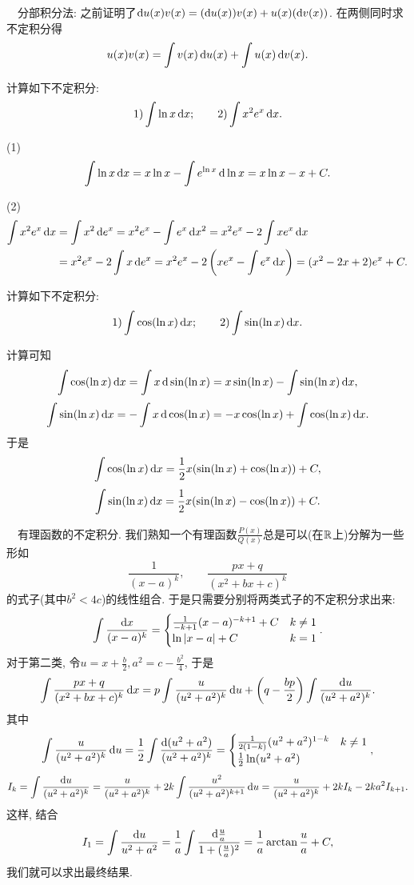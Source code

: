 ~~分部积分法: 之前证明了$\mathop{}\!\mathrm{d} u(x)v(x) = (\mathop{}\!\mathrm{d} u(x)) v(x) + u(x) (\mathop{}\!\mathrm{d} v(x))$. 在两侧同时求不定积分得$$u(x)v(x) = \int v(x) \mathop{}\!\mathrm{d} u(x) + \int u(x) \mathop{}\!\mathrm{d} v(x). $$

\begin{example}
	计算如下不定积分: $$1) \int \ln x \mathop{}\!\mathrm{d} x;\qquad 2) \int x^2e^x \mathop{}\!\mathrm{d} x. $$
\end{example}
\begin{solution}
	(1) $$\int \ln x \mathop{}\!\mathrm{d} x = x\ln x - \int e^{\ln x}\mathop{}\!\mathrm{d} \ln x = x\ln x - x + C.$$
	
	(2) \begin{align*}
		\int x^2e^x \mathop{}\!\mathrm{d} x &= \int x^2 \mathop{}\!\mathrm{d} e^x = x^2e^x - \int e^x \mathop{}\!\mathrm{d} x^2 = x^2e^x - 2\int xe^x \mathop{}\!\mathrm{d} x \\
		&= x^2e^x - 2\int x \mathop{}\!\mathrm{d} e^x = x^2e^x - 2\left( xe^x-\int e^x \mathop{}\!\mathrm{d} x \right) = (x^2-2x+2)e^x + C. 
	\end{align*}
\end{solution}

\begin{example}
	计算如下不定积分: $$1) \int \cos (\ln x) \mathop{}\!\mathrm{d} x;\qquad 2) \int \sin (\ln x) \mathop{}\!\mathrm{d} x.$$
\end{example}
\begin{solution}
	计算可知$$\int \cos (\ln x) \mathop{}\!\mathrm{d} x = \int x \mathop{}\!\mathrm{d} \sin (\ln x) = x\sin (\ln x) - \int \sin (\ln x) \mathop{}\!\mathrm{d} x,$$
	$$\int \sin (\ln x) \mathop{}\!\mathrm{d} x = -\int x \mathop{}\!\mathrm{d} \cos (\ln x) = -x\cos (\ln x) + \int \cos (\ln x) \mathop{}\!\mathrm{d} x.$$
	于是$$\int \cos (\ln x) \mathop{}\!\mathrm{d} x = \frac{1}{2}x(\sin (\ln x)+ \cos (\ln x)) +C,$$
	$$\int \sin (\ln x) \mathop{}\!\mathrm{d} x = \frac{1}{2}x(\sin (\ln x)- \cos (\ln x)) +C.$$
\end{solution}

~~有理函数的不定积分. 我们熟知一个有理函数$\frac{P(x)}{Q(x)}$总是可以(在$\mathbb{R}$上)分解为一些形如$$\frac{1}{(x-a)^k},\qquad \frac{px+q}{(x^2+bx+c)^k}$$
的式子(其中$b^2<4c$)的线性组合. 于是只需要分别将两类式子的不定积分求出来: 
$$\int \frac{\mathop{}\!\mathrm{d} x}{(x-a)^k} = \begin{cases}
	\frac{1}{-k+1}(x-a)^{-k+1}+C & k\neq 1 \\ \ln |x-a| + C & k=1
\end{cases}.$$
对于第二类, 令$u=x+\frac{b}{2}, a^2=c-\frac{b^2}{4}$, 于是$$\int \frac{px+q}{(x^2+bx+c)^k} \mathop{}\!\mathrm{d} x = p \int \frac{u}{(u^2+a^2)^k} \mathop{}\!\mathrm{d} u + \left(q-\frac{bp}{2} \right) \int \frac{\mathop{}\!\mathrm{d} u}{(u^2+a^2)^k}.$$
其中$$\int \frac{u}{(u^2+a^2)^k} \mathop{}\!\mathrm{d} u = \frac{1}{2} \int \frac{\mathop{}\!\mathrm{d} (u^2+a^2)}{(u^2+a^2)^k} = \begin{cases}
	\frac{1}{2(1-k)}(u^2+a^2)^{1-k} & k\neq 1 \\ \frac{1}{2}\ln (u^2+a^2)
\end{cases}, $$
$$I_k = \int \frac{\mathop{}\!\mathrm{d} u}{(u^2+a^2)^k} = \frac{u}{(u^2+a^2)^k} + 2k \int \frac{u^2}{(u^2+a^2)^{k+1}} \mathop{}\!\mathrm{d} u = \frac{u}{(u^2+a^2)^k} + 2kI_k - 2ka^2I_{k+1}.$$
这样, 结合$$I_1 = \int \frac{\mathop{}\!\mathrm{d} u}{u^2+a^2} = \frac{1}{a} \int \frac{\mathop{}\!\mathrm{d} \frac{u}{a}}{1+(\frac{u}{a})^2} = \frac{1}{a} \arctan \frac{u}{a} + C,$$
我们就可以求出最终结果. 

